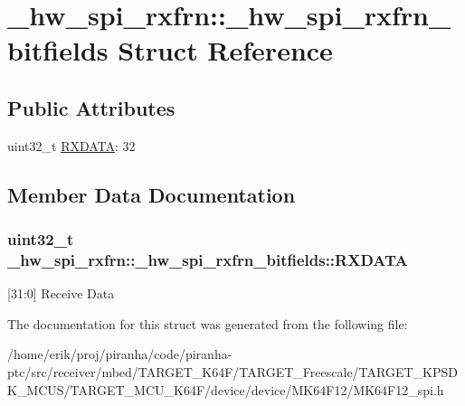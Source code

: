 \hypertarget{struct__hw__spi__rxfrn_1_1__hw__spi__rxfrn__bitfields}{}\section{\+\_\+hw\+\_\+spi\+\_\+rxfrn\+:\+:\+\_\+hw\+\_\+spi\+\_\+rxfrn\+\_\+bitfields Struct Reference}
\label{struct__hw__spi__rxfrn_1_1__hw__spi__rxfrn__bitfields}
\subsection*{Public Attributes}
\begin{DoxyCompactItemize}
\item 
uint32\+\_\+t \hyperlink{struct__hw__spi__rxfrn_1_1__hw__spi__rxfrn__bitfields_a7762c39681bb53043deb56e3c908f992}{R\+X\+D\+A\+TA}\+: 32
\end{DoxyCompactItemize}


\subsection{Member Data Documentation}
\subsubsection[{\texorpdfstring{R\+X\+D\+A\+TA}{RXDATA}}]{\setlength{\rightskip}{0pt plus 5cm}uint32\+\_\+t \+\_\+hw\+\_\+spi\+\_\+rxfrn\+::\+\_\+hw\+\_\+spi\+\_\+rxfrn\+\_\+bitfields\+::\+R\+X\+D\+A\+TA}\hypertarget{struct__hw__spi__rxfrn_1_1__hw__spi__rxfrn__bitfields_a7762c39681bb53043deb56e3c908f992}{}\label{struct__hw__spi__rxfrn_1_1__hw__spi__rxfrn__bitfields_a7762c39681bb53043deb56e3c908f992}
\mbox{[}31\+:0\mbox{]} Receive Data 

The documentation for this struct was generated from the following file\+:\begin{DoxyCompactItemize}
\item 
/home/erik/proj/piranha/code/piranha-\/ptc/src/receiver/mbed/\+T\+A\+R\+G\+E\+T\+\_\+\+K64\+F/\+T\+A\+R\+G\+E\+T\+\_\+\+Freescale/\+T\+A\+R\+G\+E\+T\+\_\+\+K\+P\+S\+D\+K\+\_\+\+M\+C\+U\+S/\+T\+A\+R\+G\+E\+T\+\_\+\+M\+C\+U\+\_\+\+K64\+F/device/device/\+M\+K64\+F12/M\+K64\+F12\+\_\+spi.\+h\end{DoxyCompactItemize}

